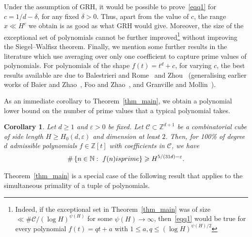 \documentclass[11pt,letterpaper]{amsart}
\renewcommand{\leq}{\leqslant}
\renewcommand{\geq}{\geqslant}
\newtheorem{corollary}[theorem]{Corollary}
\theoremstyle{definition}
\numberwithin{equation}{section}
\newcommand{\0}{\mathbf{0}}
\begin{document}
Under the assumption of GRH, it would be possible to prove~\eqref{eqq1} for $c=1/d-\delta$, for any fixed $\delta>0$. Thus, apart from the value of $c$, the range $x\ll H^c$ we obtain is as good as what GRH would give. 
Moreover, the size of the exceptional set of polynomials cannot be further improved\footnote{Indeed, if the exceptional set in Theorem~\ref{thm_main} was of size $\ll\# \mathscr{C}/(\log H)^{\psi(H)}$ for some $\psi(H)\to \infty$, then~\eqref{eqq1} would be true for every polynomial $f(t)=qt+a$ with $1\leq a,q\leq (\log H)^{\psi(H)/2}$} without improving the Siegel--Walfisz theorem. 
    Finally,  we mention some further results in the literature which use averaging over only one coefficient to capture prime values of polynomials. For polynomials of the shape $f(t)=t^d+c$, for varying $c$, the best results available are due to Balestrieri and Rome~\cite{rome} and Zhou~\cite{zhou} (generalising earlier works of Baier and Zhao~\cite{baier-zhao}, Foo and Zhao~\cite{foo-zhao}, and Granville and Mollin~\cite[Prop.~1]{granville-mollin}).
    

 

As an immediate corollary to Theorem~\ref{thm_main}, we obtain a polynomial lower bound on the number of prime values that a typical polynomial takes.

\begin{corollary}
\label{cor:H}
Let $d\geq 1$ and $\varepsilon>0$ be fixed.  Let $\mathscr{C}\subset \mathbb{Z}^{d+1}$ be a combinatorial cube of side length $H\geq H_0(d,\varepsilon)$ and dimension at least $2$.  Then, for 100\% of degree $d$ 
admissible polynomials $f\in \mathbb{Z}[t]$  with coefficients in $\mathscr{C}$, we have
$$
\#\left\{n\in \mathbb{N}:\,\, f(n) \textnormal{ is prime}\right\}\geq H^{5/(31d)-\varepsilon}.    
$$
\end{corollary}


Theorem~\ref{thm_main} is a special case of the following result that applies to the simultaneous primality of a tuple of polynomials. 
\end{document}
